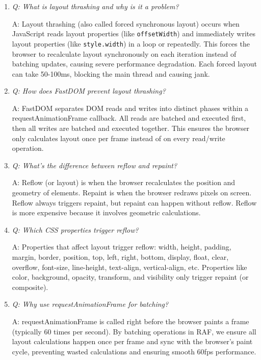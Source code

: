 \documentclass[11pt]{article}
\begin{document}
\begin{enumerate}
\item \emph{Q: What is layout thrashing and why is it a problem?}

A: Layout thrashing (also called forced synchronous layout) occurs when JavaScript reads layout properties (like \texttt{offsetWidth}) and immediately writes layout properties (like \texttt{style.width}) in a loop or repeatedly. This forces the browser to recalculate layout synchronously on each iteration instead of batching updates, causing severe performance degradation. Each forced layout can take 50-100ms, blocking the main thread and causing jank.

\item \emph{Q: How does FastDOM prevent layout thrashing?}

A: FastDOM separates DOM reads and writes into distinct phases within a requestAnimationFrame callback. All reads are batched and executed first, then all writes are batched and executed together. This ensures the browser only calculates layout once per frame instead of on every read/write operation.

\item \emph{Q: What's the difference between reflow and repaint?}

A: Reflow (or layout) is when the browser recalculates the position and geometry of elements. Repaint is when the browser redraws pixels on screen. Reflow always triggers repaint, but repaint can happen without reflow. Reflow is more expensive because it involves geometric calculations.

\item \emph{Q: Which CSS properties trigger reflow?}

A: Properties that affect layout trigger reflow: width, height, padding, margin, border, position, top, left, right, bottom, display, float, clear, overflow, font-size, line-height, text-align, vertical-align, etc. Properties like color, background, opacity, transform, and visibility only trigger repaint (or composite).

\item \emph{Q: Why use requestAnimationFrame for batching?}

A: requestAnimationFrame is called right before the browser paints a frame (typically 60 times per second). By batching operations in RAF, we ensure all layout calculations happen once per frame and sync with the browser's paint cycle, preventing wasted calculations and ensuring smooth 60fps performance.
\end{enumerate}
\end{document}
